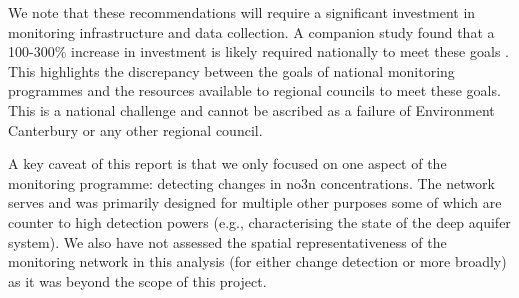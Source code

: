 We note that these recommendations will require a significant investment in monitoring infrastructure and data collection.  A companion study found that a 100-300\% increase in investment is likely required nationally to meet these goals \citep{dumont_determining_nodate}. This highlights the discrepancy between the goals of national monitoring programmes and the resources available to regional councils to meet these goals. This is a national challenge and cannot be ascribed as a failure of Environment Canterbury or any other regional council.

A key caveat of this report is that we only focused on one aspect of the monitoring programme: detecting changes in \gls{no3n} concentrations. The network serves and was primarily designed for multiple other purposes some of which are counter to high detection powers (e.g., characterising the state of the deep aquifer system). We also have not assessed the spatial representativeness of the monitoring network in this analysis (for either change detection or more broadly) as it was beyond the scope of this project.